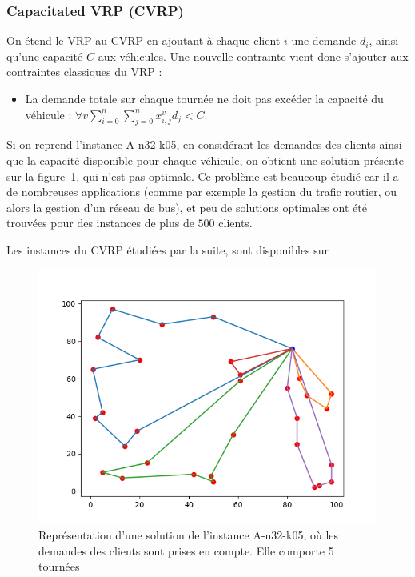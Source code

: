 \documentclass[a4paper,11pt]{article}%
\begin{document}
\subsubsection{Capacitated VRP (CVRP)}

On étend le VRP au CVRP en ajoutant à chaque client $i$ une demande $d_i$, ainsi qu'une capacité $C$ aux véhicules.
Une nouvelle contrainte vient donc s'ajouter aux contraintes classiques du VRP :

\begin{itemize}
\item La demande totale sur chaque tournée ne doit pas excéder la capacité du véhicule : $\forall v \sum_{i = 0}^{n} \sum_{j = 0}^{n} x_{i,j}^v d_j < C$.
\end{itemize}

Si on reprend l'instance A-n32-k05, en considérant les demandes des clients ainsi que la capacité disponible pour chaque véhicule, on obtient une solution présente sur la figure~\ref{SC3205}, qui n'est pas optimale. 
Ce problème est beaucoup étudié car il a de nombreuses applications (comme par exemple la gestion du trafic routier, ou alors la gestion d'un réseau de bus), et peu de solutions optimales ont été trouvées pour des instances de plus de $500$ clients. 

Les instances du CVRP étudiées par la suite, sont disponibles sur~\cite{cvrplib} 

\begin{figure}
\centering
\includegraphics[scale=0.5]{solutionCapacity.png}
\caption{Représentation d'une solution de l'instance A-n32-k05, où les demandes des clients sont prises en compte. Elle comporte 5 tournées}
\label{SC3205}
\end{figure}
\end{document}
